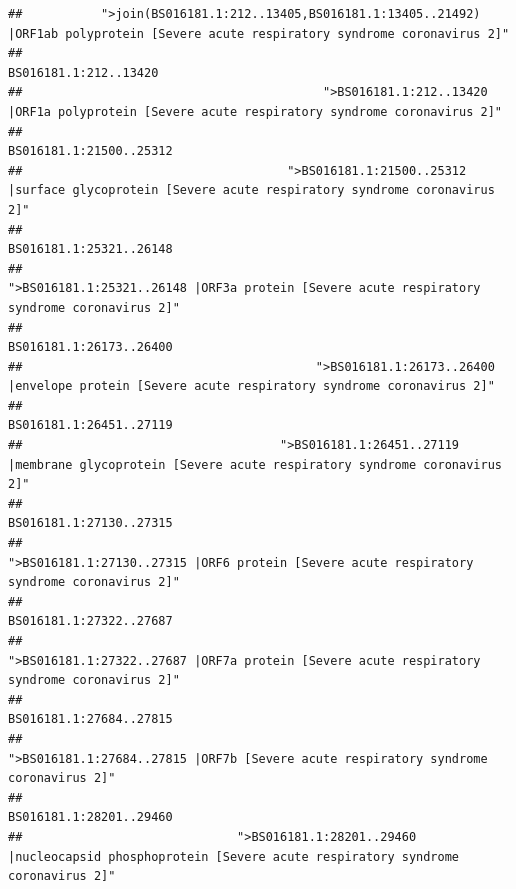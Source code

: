 \documentclass[
]{article}
\begin{document}
\begin{verbatim}
##           ">join(BS016181.1:212..13405,BS016181.1:13405..21492) |ORF1ab polyprotein [Severe acute respiratory syndrome coronavirus 2]" 
##                                                                                                                  BS016181.1:212..13420 
##                                          ">BS016181.1:212..13420 |ORF1a polyprotein [Severe acute respiratory syndrome coronavirus 2]" 
##                                                                                                                BS016181.1:21500..25312 
##                                     ">BS016181.1:21500..25312 |surface glycoprotein [Severe acute respiratory syndrome coronavirus 2]" 
##                                                                                                                BS016181.1:25321..26148 
##                                            ">BS016181.1:25321..26148 |ORF3a protein [Severe acute respiratory syndrome coronavirus 2]" 
##                                                                                                                BS016181.1:26173..26400 
##                                         ">BS016181.1:26173..26400 |envelope protein [Severe acute respiratory syndrome coronavirus 2]" 
##                                                                                                                BS016181.1:26451..27119 
##                                    ">BS016181.1:26451..27119 |membrane glycoprotein [Severe acute respiratory syndrome coronavirus 2]" 
##                                                                                                                BS016181.1:27130..27315 
##                                             ">BS016181.1:27130..27315 |ORF6 protein [Severe acute respiratory syndrome coronavirus 2]" 
##                                                                                                                BS016181.1:27322..27687 
##                                            ">BS016181.1:27322..27687 |ORF7a protein [Severe acute respiratory syndrome coronavirus 2]" 
##                                                                                                                BS016181.1:27684..27815 
##                                                    ">BS016181.1:27684..27815 |ORF7b [Severe acute respiratory syndrome coronavirus 2]" 
##                                                                                                                BS016181.1:28201..29460 
##                              ">BS016181.1:28201..29460 |nucleocapsid phosphoprotein [Severe acute respiratory syndrome coronavirus 2]" 

\end{verbatim}
\end{document}
